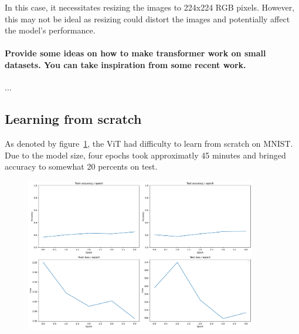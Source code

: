 In this case, it necessitates resizing the images to 224x224 RGB pixels. However, this may not be ideal as resizing could distort the images and potentially affect the model's performance.

\paragraph{Provide some ideas on how to make transformer work on small datasets. You can take inspiration from some recent work.}
...

\subsection{Learning from scratch}
As denoted by figure~\ref{fig:stats_vit}, the ViT had difficulty to learn from scratch on MNIST. Due to the model size, four epochs took approximatly 45 minutes and bringed accuracy to somewhat 20 percents on test.

\begin{figure}[H]
    \centering
    \includegraphics*[width=0.9\textwidth]{figs/Transformers/stats_vit.pdf}
    \caption{}
    \label{fig:stats_vit}
\end{figure}


